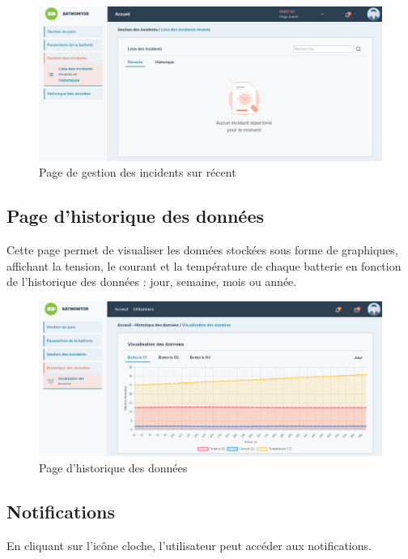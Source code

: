 \begin{figure}[H]
	\centering
	\includegraphics[width=17cm]{./img/interface/listeIncident.png}
	\caption{Page de gestion des incidents sur récent}
	\label{fig:relais_5vdc}
\end{figure}



\subsection{Page d'historique des données}

Cette page permet de visualiser les données stockées sous forme de graphiques, affichant la tension, le courant et la température de chaque batterie en fonction de l'historique des données : jour, semaine, mois ou année.

\begin{figure}[H]
	\centering
	\includegraphics[width=17cm]{./img/interface/visualisationDonne.png}
	\caption{Page d'historique des données}
	\label{fig:relais_5vdc}
\end{figure}

\subsection{Notifications}

En cliquant sur l'icône cloche, l'utilisateur peut accéder aux notifications.

